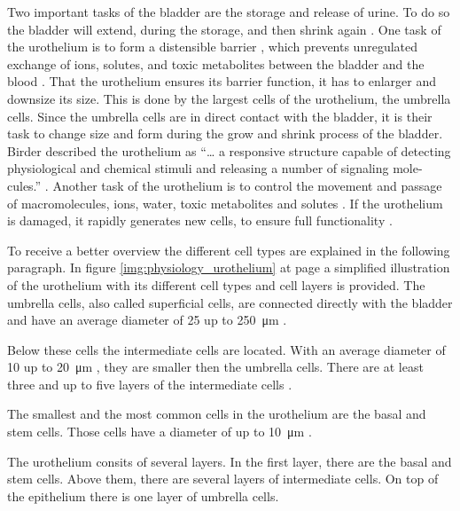 Two important tasks of the bladder are the storage and release of urine. To do so the bladder will extend, during the storage, and then shrink again \cite{Karl-ErikAndersson2004}. One task of the urothelium is to form a distensible barrier \cite{Apodaca2004, Lazzeri2006, PuneetKhandelwal2009, Lewis2000, WRCross2005}, which prevents unregulated exchange of ions, solutes, and toxic metabolites between the bladder and the blood \cite{Apodaca2004, Lazzeri2006, PuneetKhandelwal2009, Lewis2000}. That the urothelium ensures its barrier function, it has to enlarger and downsize its size. This is done by the largest cells of the urothelium, the umbrella cells. Since the umbrella cells are in direct contact with the bladder, it is their task to change size and form during the grow and shrink process of the bladder. Birder described the urothelium as “… a responsive structure capable of detecting physiological and chemical stimuli and releasing a number of signaling mole-cules.” \cite{Birder2005}. Another task of the urothelium is to control the movement and passage of macromolecules, ions, water, toxic metabolites and solutes \cite{Apodaca2004, PuneetKhandelwal2009}. If the urothelium is damaged, it rapidly generates new cells, to ensure full functionality \cite{Apodaca2004, Yamany2014, PuneetKhandelwal2009}.

To receive a better overview the different cell types are explained in the following paragraph. In figure \ref{img:physiology_urothelium} at page \pageref{img:physiology_urothelium} a simplified illustration of the urothelium with its different cell types and cell layers is provided. \newline
The umbrella cells, also called superficial cells, are connected directly with the bladder and have an average diameter of 25 up to \SI{250}{\micro\metre} \cite{Yamany2014, PuneetKhandelwal2009}. 

Below these cells the intermediate cells are located. With an average diameter of 10 up to \SI{20}{\micro\metre} \cite{Yamany2014, PuneetKhandelwal2009}, they are smaller then the umbrella cells. There are at least three and up to five layers of the intermediate cells \cite{REF}. 

The smallest and the most common cells in the urothelium are the basal and stem cells. Those cells have a diameter of up to \SI{10}{\micro\metre} \cite{Lazzeri2006, PuneetKhandelwal2009}. 

The urothelium consits of several layers. In the first layer, there are the basal and stem cells. Above them, there are several layers of intermediate cells. On top of the epithelium there is one layer of umbrella cells.

